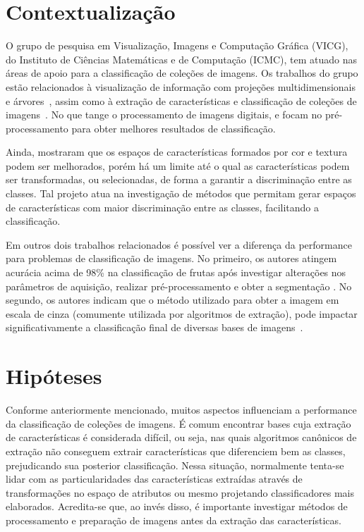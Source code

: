 \section{Contextualização}

O grupo de pesquisa em Visualização, Imagens e Computação Gráfica (VICG), do Instituto de Ciências Matemáticas e de Computação (ICMC), tem atuado nas áreas de apoio para a classificação de coleções de imagens. Os trabalhos do grupo estão relacionados à visualização de informação com projeções multidimensionais e árvores~\cite{Joia2011}, assim como à extração de características e classificação de coleções de imagens~\cite{Paiva2011}. No que tange o processamento de imagens digitais,  e  focam no pré-processamento para obter melhores resultados de classificação.

Ainda,  mostraram que os espaços de características formados por cor e textura podem ser melhorados, porém há um limite até o qual as características podem ser transformadas, ou selecionadas, de forma a garantir a discriminação entre as classes. Tal projeto atua na investigação de métodos que permitam gerar espaços de características com maior discriminação entre as classes, facilitando a classificação.

Em outros dois trabalhos relacionados é possível ver a diferença da performance para problemas de classificação de imagens. No primeiro, os autores atingem acurácia acima de 98\% na classificação de frutas após investigar alterações nos parâmetros de aquisição, realizar pré-processamento e obter a segmentação \cite{Rocha2010}. No segundo, os autores indicam que o método utilizado para obter a imagem em escala de cinza (comumente utilizada por algoritmos de extração), pode impactar significativamente a classificação final de diversas bases de imagens~\cite{Kanan2012}.


\section{Hipóteses}

Conforme anteriormente mencionado, muitos aspectos influenciam a performance da classificação de coleções de imagens. É comum encontrar bases cuja extração de características é considerada difícil, ou seja, nas quais algoritmos canônicos de extração não conseguem extrair características que diferenciem bem as classes, prejudicando sua posterior classificação. Nessa situação, normalmente tenta-se lidar com as particularidades das características extraídas através de transformações no espaço de atributos ou mesmo projetando classificadores mais elaborados. Acredita-se que, ao invés disso, é importante investigar métodos de processamento e preparação de imagens antes da extração das características.

